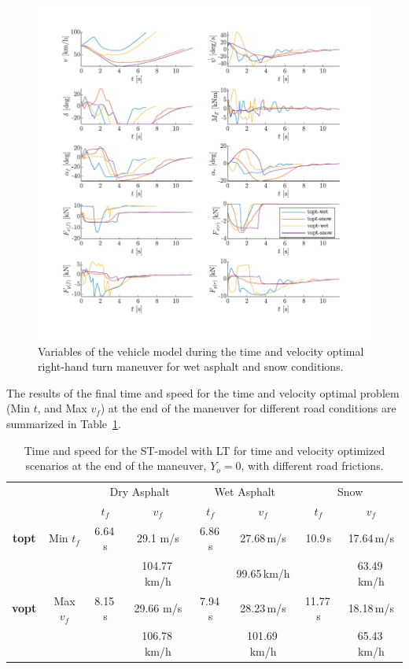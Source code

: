\begin{figure}[h!]
    \centering
    \includegraphics{figures/pep2_FricComp_detailplot.pdf}
    \caption{Variables of the vehicle model during the time and velocity optimal right-hand turn maneuver for wet asphalt and snow conditions.}
    \label{fig:pep2_FricComp_detailplot}
\end{figure}

\clearpage
The results of the final time and speed for the time and velocity optimal problem (Min $t$, and Max $v_f$) at the end of the maneuver for different road conditions are summarized in Table~\ref{tab:opt_res_num_pep2_fric}. 

\begin{table}[h!]
    \centering
    \begin{tabular}{c|c|c|c|c|c|c|c}
        & & \multicolumn{2}{c|}{Dry Asphalt} & \multicolumn{2}{c|}{Wet Asphalt} & \multicolumn{2}{c}{Snow}\\
        & & $t_f$ & $v_f$ & $t_f$ & $v_f$ & $t_f$ & $v_f$\\
        \hline
        \textbf{topt} & Min $t_f$ & 6.64\,s & 29.1 m/s & 6.86\,s & 27.68\,m/s & 10.9\,s & 17.64\,m/s\\
        & & & 104.77\,km/h & & 99.65\,km/h & & 63.49\,km/h\\
        \textbf{vopt} & Max $v_f$ & 8.15\,s & 29.66 m/s & 7.94\,s & 28.23\,m/s & 11.77\,s & 18.18\,m/s\\
        & & & 106.78\,km/h & & 101.69\,km/h & & 65.43\,km/h\\
    \end{tabular}
    \caption{Time and speed for the ST-model with LT for time and velocity optimized scenarios at the end of the maneuver, $Y_o = 0$, with different road frictions.}
    \label{tab:opt_res_num_pep2_fric}
\end{table}

